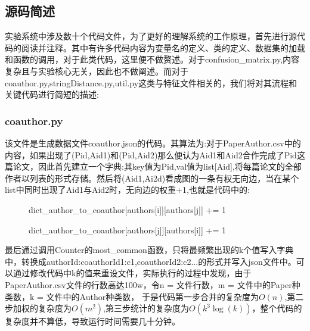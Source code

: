 \documentclass{mcmthesis}
\begin{document}
	\subsection{源码简述}
		\par 实验系统中涉及数十个代码文件，为了更好的理解系统的工作原理，首先进行源代码的阅读并注释。其中有许多代码内容为变量名的定义、类的定义、数据集的加载和函数的调用，对于此类代码，这里便不做赘述。对于confusion\_matrix.py,内容复杂且与实验核心无关，因此也不做阐述。而对于coauthor.py,stringDistance.py,util.py这类与特征文件相关的，我们将对其流程和关键代码进行简短的描述:
		\subsubsection{coauthor.py}
		\par 该文件是生成数据文件coauthor.json的代码。其算法为:对于PaperAuthor.csv中的内容，如果出现了(Pid,Aid1)和(Pid,Aid2)那么便认为Aid1和Aid2合作完成了Pid这篇论文，因此首先建立一个字典:其key值为Pid,val值为list[Aid],将每篇论文的全部作者以列表的形式存储。然后将(Aid1,Ai2d)看成图的一条有权无向边，当在某个list中同时出现了Aid1与Aid2时，无向边的权重+1,也就是代码中的:
			\begin{description}
			\item [\qquad \quad] dict\_author\_to\_coauthor[authors[i]][authors[j]] += 1
			\item [\qquad \quad] dict\_author\_to\_coauthor[authors[j]][authors[i]] += 1
			\end{description}
		最后通过调用Counter的most\_common函数，只将最频繁出现的k个值写入字典中，转换成authorId:{coauthorId1:c1,coauthorId2:c2...}的形式并写入json文件中。可以通过修改代码中k的值来重设文件，实际执行的过程中发现，由于PaperAuthor.csv文件的行数高达100w，令n = 文件行数，m = 文件中的Paper种类数，k = 文件中的Author种类数， 于是代码第一步合并的复杂度为$O(n)$,第二步加权的复杂度为$O(m^2)$,第三步统计的复杂度为$O(k^3\log(k))$，整个代码的复杂度并不算低，导致运行时间需要几十分钟。
\end{document}
